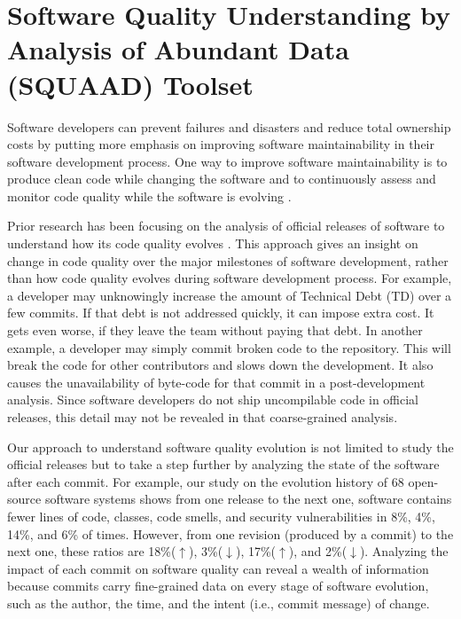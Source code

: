 \section{Software Quality Understanding by Analysis of Abundant Data (SQUAAD) Toolset}
\label{sec:squaad}

Software developers can prevent failures and disasters and reduce total ownership costs by putting more emphasis on improving software maintainability in their software development process.
One way to improve software maintainability is to produce clean code while changing the software and to continuously assess and monitor code quality while the software is evolving \citep {mexim2015introduction}.

Prior research has been focusing on the analysis of official releases of software to understand how its code quality evolves \citep{PINTO201559,tu2000evolution,ganpati2012comparative,d2008analysing,le2015empirical}.
This approach gives an insight on change in code quality over the major milestones of software development, rather than how code quality evolves during software development process. 
For example, a developer may unknowingly increase the amount of Technical Debt (TD) over a few commits. If that debt is not addressed quickly, it can impose extra cost.
It gets even worse, if they leave the team without paying that debt.
In another example, a developer may simply commit broken code to the repository.
This will break the code for other contributors and slows down the development.
It also causes the unavailability of byte-code for that commit in a post-development analysis.
Since software developers do not ship uncompilable code in official releases, this detail may not be revealed in that coarse-grained analysis. 

Our approach to understand software quality evolution is not limited to study the official releases but to take a step further by analyzing the state of the software after each commit.
For example, our study on the evolution history of  68 open-source software systems shows from one release to the next one, software contains fewer lines of code, classes, code smells, and security vulnerabilities in 8\%, 4\%, 14\%, and 6\% of times.
However, from one revision (produced by a commit) to the next one, these ratios are 18\%($\uparrow$), 3\%($\downarrow$), 17\%($\uparrow$), and 2\%($\downarrow$).
Analyzing the impact of each commit on software quality can reveal a wealth of information because commits carry fine-grained data on every stage of software evolution, such as the author, the time, and the intent (i.e., commit message) of change.


